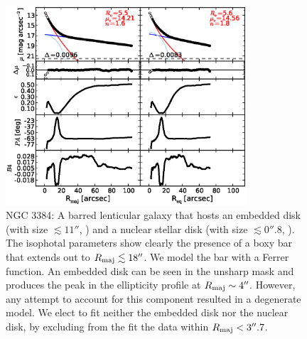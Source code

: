 \documentclass[preprint2]{emulateapj}
\newcommand{\fitfigurewidth}{0.8\textwidth}
\begin{document}
  \begin{figure}[h]
  \begin{center}
  \includegraphics[width=\fitfigurewidth]{images/n3384_1Dfit.eps}
  \caption{NGC 3384: 
  A barred lenticular galaxy that hosts 
  an embedded disk (with size $\lesssim 11''$, \citealt{erwin2004}) and 
  a nuclear stellar disk (with size $\lesssim 0''.8$, \citealt{ledo2010}).
  The isophotal parameters show clearly the presence of a boxy bar that extends out to $R_{\rm maj} \lesssim 18''$.
  We model the bar with a Ferrer function.
  An embedded disk can be seen in the unsharp mask and produces the peak in the ellipticity profile at $R_{\rm maj} \sim 4''$.
  However, any attempt to account for this component resulted in a degenerate model.
  We elect to fit neither the embedded disk nor the nuclear disk, by excluding from the fit the data within $R_{\rm maj} < 3''.7$. 
  }
  \end{center}
  \end{figure}
\end{document}

